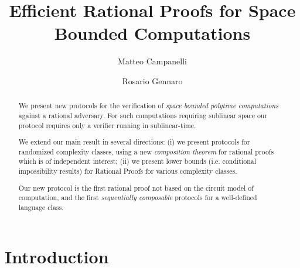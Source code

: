 \documentclass{llncs}
\begin{document}
\title{Efficient Rational Proofs for Space Bounded Computations}
\author{Matteo Campanelli \and Rosario Gennaro}

\maketitle

\begin{abstract}
	We present new protocols for the verification of {\em space bounded polytime computations} against a rational adversary. For such computations requiring sublinear space our protocol requires only a verifier running in sublinear-time.
	
	We extend our main result in several directions: (i) we present protocols for randomized complexity classes, using a new {\em composition theorem} for rational proofs which is of independent interest; (ii) we present lower bounds (i.e. conditional impossibility results) for Rational Proofs for various complexity classes.
	
	Our new protocol is the first rational proof not based on the circuit model of computation, and the first {\em sequentially composable} protocols for a well-defined language class.
\end{abstract}





\newcommand{\protOne}{\pi^{L_2}_{1}}
\newcommand{\protTwo}{\pi_{2}}
\newcommand{\rewGap}{\Delta}
\newcommand{\STEP}{\function{STEP}}

\newcommand{\disTransc}{\tilde{\Tau}}

	
	\section{Introduction}
	
	
	
	
\end{document}
